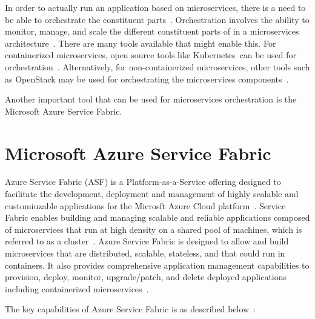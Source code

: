 In order to actually run an application based on microservices, there
is a need to be able to orchestrate the constituent
parts~\cite{hid-sp18-501-opensource}. Orchestration involves 
the ability to monitor, manage, and
scale the different constituent parts of in a microservices
architecture~\cite{hid-sp18-501-opensource}. There are many tools available 
that might enable this. For
containerized microservices, open source tools like Kubernetes can be
used for orchestration~\cite{hid-sp18-501-onfido}. Alternatively, for
non-containerized microservices, other tools such as OpenStack may be
used for orchestrating the microservices
components~\cite{hid-sp18-501-rackspace}.

Another important tool that can be used for microservices
orchestration is the Microsoft Azure Service Fabric.



\section{Microsoft Azure Service Fabric}
Azure Service Fabric (ASF) is a Platform-as-a-Service offering
designed to facilitate the development, deployment and management of
highly scalable and customiuzable applications for the Microsft Azure
Cloud platform~\cite{hid-sp18-501-definition}. Service Fabric enables
building and managing scalable and reliable applications composed of
microservices that run at high density on a shared pool of machines,
which is referred to as a cluster~\cite{hid-sp18-501-overview}. 
Azure Service Fabric is designed to allow and build microservices that are
distributed, scalable, stateless, and that could run in containers.
It also provides
comprehensive application management capabilities to provision,
deploy, monitor, upgrade/patch, and delete deployed applications
including containerized microservices~\cite{hid-sp18-501-overview}.

The key capabilities of Azure Service Fabric is as described
below~\cite{hid-sp18-501-overview}:

